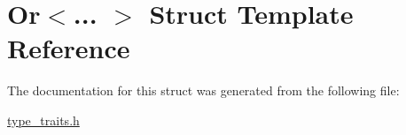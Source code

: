 \hypertarget{struct_or}{}\section{Or$<$... $>$ Struct Template Reference}
\label{struct_or}


The documentation for this struct was generated from the following file\+:\begin{DoxyCompactItemize}
\item 
\hyperlink{type__traits_8h}{type\+\_\+traits.\+h}\end{DoxyCompactItemize}
